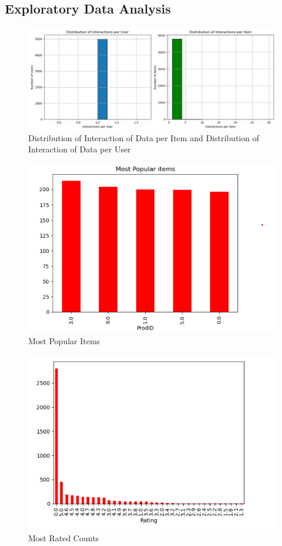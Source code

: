 \documentclass[12pt, a4paper, oneside]{article}
\begin{document}
\break
\pagebreak
\newpage
\subsection*{ Exploratory Data Analysis}
\begin{figure}[!h]
\captionsetup{list=false}
\includegraphics[width=\linewidth ]{dipi_dipu}
\centering
\caption{Distribution of Interaction of Data per Item and Distribution of Interaction of Data per User}
\label{fig:dipi_dipu}
\end{figure}

\begin{figure}[!h]
\captionsetup{list=false}
\includegraphics[width=\linewidth ]{most_popular_items}
\centering
\caption{Most Popular Items}
\label{fig:most_popular_items}
\end{figure}


\begin{figure}[!h]
\captionsetup{list=false}
\includegraphics[width=\linewidth ]{most_rated_counts}
\centering
\caption{Most Rated Counts}
\label{fig:most_rated_counts}
\end{figure}
\end{document}
